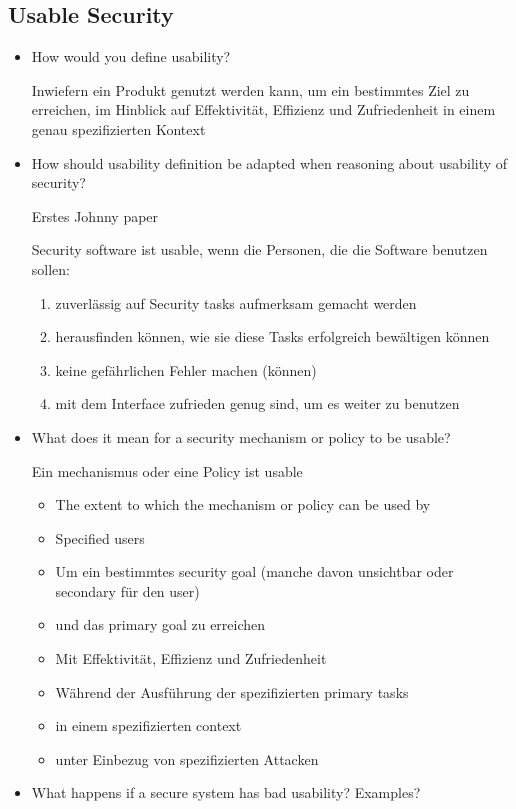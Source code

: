 \subsection{Usable Security}
\begin{itemize}
	\item
		How would you define usability?

		Inwiefern ein Produkt genutzt werden kann, um ein bestimmtes Ziel zu erreichen, im Hinblick auf Effektivität, Effizienz und Zufriedenheit in einem genau spezifizierten Kontext
	\item
		How should usability definition be adapted when reasoning about usability of security?

		Erstes Johnny paper

		Security software ist usable, wenn die Personen, die die Software benutzen sollen:
		\begin{enumerate}
			\item
				zuverlässig auf Security tasks aufmerksam gemacht werden
			\item
				herausfinden können, wie sie diese Tasks erfolgreich bewältigen können
			\item
				keine gefährlichen Fehler machen (können)
			\item
				mit dem Interface zufrieden genug sind, um es weiter zu benutzen
		\end{enumerate}
	\item
		What does it mean for a security mechanism or policy to be usable?

		Ein mechanismus oder eine Policy ist usable

		\begin{itemize}
			\item
				The extent to which the mechanism or policy can be used by
			\item
				Specified users
			\item
				Um ein bestimmtes security goal (manche davon unsichtbar oder secondary für den user)
			\item
				und das primary goal zu erreichen
			\item
				Mit Effektivität, Effizienz und Zufriedenheit
			\item
				Während der Ausführung der spezifizierten primary tasks
			\item
				in einem spezifizierten context
			\item
				unter Einbezug von spezifizierten Attacken
		\end{itemize}
	\item
		What happens if a secure system has bad usability? Examples?


\end{itemize}
